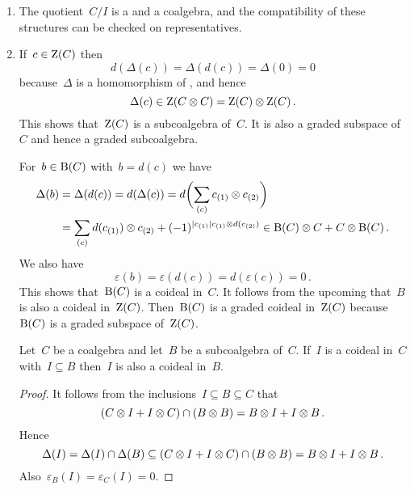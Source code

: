 \begin{enumerate}[start=3]
  \item
    The quotient~$C/I$ is a {\dgv} and a coalgebra, and the compatibility of these structures can be checked on representatives.
  \item
    If~$c \in \operatorname{Z}(C)$ then
    \[
      d(\Delta(c))
      =
      \Delta(d(c))
      =
      \Delta(0)
      =
      0
    \]
    because~$\Delta$ is a homomorphism of {\dgvs}, and hence
    \[
      \Delta(c)
      \in
      \operatorname{Z}(C \otimes C)
      =
      \operatorname{Z}(C) \otimes \operatorname{Z}(C) \,.
    \]
    This shows that~$\operatorname{Z}(C)$ is a subcoalgebra of~$C$.
    It is also a graded subspace of~$C$ and hence a graded subcoalgebra.

    For~$b \in \operatorname{B}(C)$ with~$b = d(c)$ we have
    \begin{align*}
      \Delta(b)
      &=
      \Delta(d(c))
      =
      d(\Delta(c))
      =
      d\biggl( \sum_{(c)} c_{(1)} \otimes c_{(2)} \biggr)
      \\
      &=
      \sum_{(c)}
      d(c_{(1)}) \otimes c_{(2)}
      +
      (-1)^{\lvert c_{(1)}\rvert c_{(1)} \otimes d(c_{(2)})}
      \in
      \operatorname{B}(C) \otimes C + C \otimes \operatorname{B}(C) \,.
    \end{align*}
    We also have
    \[
      \varepsilon(b)
      =
      \varepsilon(d(c))
      =
      d(\varepsilon(c))
      =
      0 \,.
    \]
    This shows that~$\operatorname{B}(C)$ is a coideal in~$C$.
    It follows from the upcoming  that~$B$ is also a coideal in~$\operatorname{Z}(C)$.
    Then~$\operatorname{B}(C)$ is a graded coideal in~$\operatorname{Z}(C)$ because~$\operatorname{B}(C)$ is a graded subspace of~$\operatorname{Z}(C)$.

    \begin{lemma}
      \label{restriction of coideals}
      Let~$C$ be a coalgebra and let~$B$ be a subcoalgebra of~$C$.
      If~$I$ is a coideal in~$C$ with~$I \subseteq B$ then~$I$ is also a coideal in~$B$.
    \end{lemma}

    \begin{proof}
      It follows from the inclusions~$I \subseteq B \subseteq C$ that
      \[
        (C \otimes I + I \otimes C) \cap (B \otimes B)
        =
        B \otimes I + I \otimes B \,.
      \]
      Hence
      \[
        \Delta(I)
        =
        \Delta(I) \cap \Delta(B)
        \subseteq
        (C \otimes I + I \otimes C) \cap (B \otimes B)
        =
        B \otimes I + I \otimes B \,.
      \]
      Also~$\varepsilon_B(I) = \varepsilon_C(I) = 0$.
    \end{proof}
\end{enumerate}





